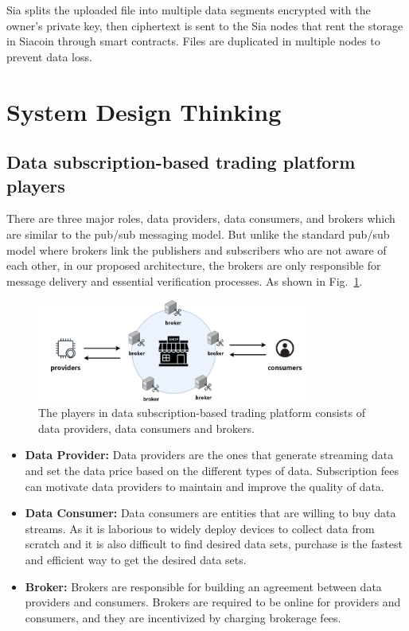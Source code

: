 \documentclass[conference]{IEEEtran}
\begin{document}
Sia\cite{Sia} splits the uploaded file into multiple data segments encrypted with the owner's private key, then ciphertext is sent to the Sia nodes that rent the storage in Siacoin through smart contracts. Files are duplicated in multiple nodes to prevent data loss.

\section{System Design Thinking}
\label{section:design_thinking}
\subsection{Data subscription-based trading platform players}
There are three major roles, data providers, data consumers, and brokers which are similar to the pub/sub messaging model. But unlike the standard pub/sub model where brokers link the publishers and subscribers who are not aware of each other, in our proposed architecture, the brokers are only responsible for message delivery and essential verification processes. As shown in Fig.~\ref{fig:pub_sub_model}.

\begin{figure}[!t]
    \centering
    \includegraphics[width=3.5in]{pub_sub_model}
    \caption{The players in data subscription-based trading platform consists of data providers, data consumers and brokers.}
    \label{fig:pub_sub_model}
\end{figure}

\begin{itemize}
\item \textbf{Data Provider: }
Data providers are the ones that generate streaming data and set the data price based on the different types of data. Subscription fees can motivate data providers to maintain and improve the quality of data.
\item \textbf{Data Consumer: }
Data consumers are entities that are willing to buy data streams. As it is laborious to widely deploy devices to collect data from scratch and it is also difficult to find desired data sets, purchase is the fastest and efficient way to get the desired data sets.
\item \textbf{Broker: }
Brokers are responsible for building an agreement between data providers and consumers. Brokers are required to be online for providers and consumers, and they are incentivized by charging brokerage fees.
\end{itemize}
\end{document}

